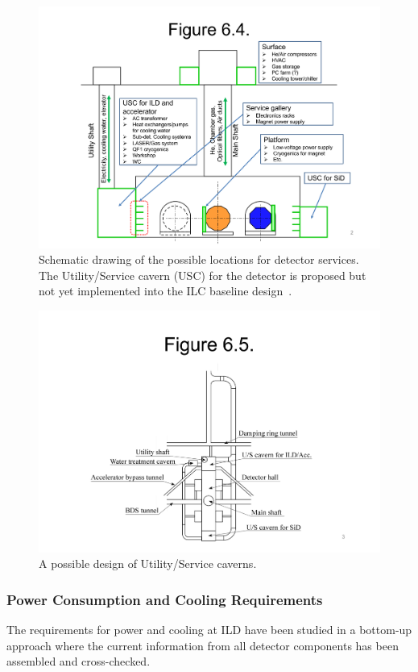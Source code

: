 \begin{figure}[h!]
\includegraphics[width=1.0\hsize]{Integration/fig/Services_v2.pdf}
\caption{\label{fig:integration:services}Schematic drawing of the possible locations for detector services. The Utility/Service cavern (USC) for the detector is proposed but not yet implemented into the ILC baseline design~\cite{ild:bib:services_figure}. }
\end{figure}

\begin{figure}[h!]
\centering
\includegraphics[width=1.0\hsize]{Integration/fig/underground.pdf}
\caption{\label{fig:integration:USC}A possible design of Utility/Service caverns. }
\end{figure}

\subsubsection{Power Consumption and Cooling Requirements}
\label{ild:sec:power}
The requirements for power and cooling at ILD have been studied in a bottom-up approach where the current information from all detector components has been assembled and cross-checked.

